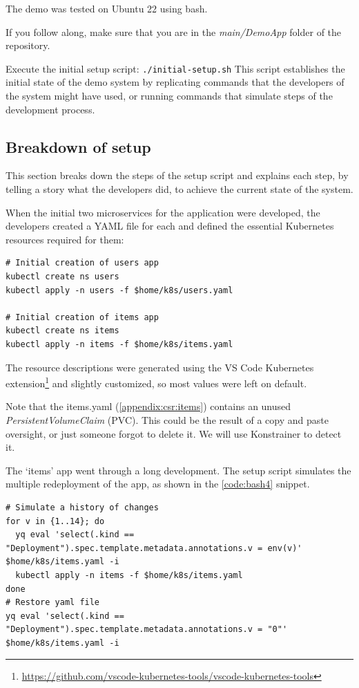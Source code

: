 The demo was tested on Ubuntu 22 using bash.

If you follow along, make sure that you are in the \emph{main/DemoApp} folder of the repository.

Execute the initial setup script: \lstinline|./initial-setup.sh| This script establishes the initial state of the demo system by replicating commands that the developers of the system might have used, or running commands that simulate steps of the development process.

\subsection{Breakdown of setup}

This section breaks down the steps of the setup script and explains each step, by telling a story what the developers did, to achieve the current state of the system.

When the initial two microservices for the application were developed, the developers created a YAML file for each and defined the essential Kubernetes resources required for them:

\begin{lstlisting}[caption={Create first deployment},language=mybash,label=code:bash3]
# Initial creation of users app
kubectl create ns users
kubectl apply -n users -f $home/k8s/users.yaml

# Initial creation of items app
kubectl create ns items
kubectl apply -n items -f $home/k8s/items.yaml
\end{lstlisting}

The resource descriptions were generated using the VS Code Kubernetes extension\footnote{\url{https://github.com/vscode-kubernetes-tools/vscode-kubernetes-tools}} and slightly customized, so most values were left on default.

Note that the items.yaml (\ref{appendix:csr:items}) contains an unused \emph{PersistentVolumeClaim} (PVC). This could be the result of a copy and paste oversight, or just someone forgot to delete it. We will use Konstrainer to detect it.

The `items' app went through a long development. The setup script simulates the multiple redeployment of the app, as shown in the \ref{code:bash4} snippet.

\begin{lstlisting}[caption={Simulate redeployment of the `items' app},language=mybash,label=code:bash4]
# Simulate a history of changes
for v in {1..14}; do
  yq eval 'select(.kind == "Deployment").spec.template.metadata.annotations.v = env(v)' $home/k8s/items.yaml -i
  kubectl apply -n items -f $home/k8s/items.yaml
done
# Restore yaml file
yq eval 'select(.kind == "Deployment").spec.template.metadata.annotations.v = "0"' $home/k8s/items.yaml -i
\end{lstlisting}

